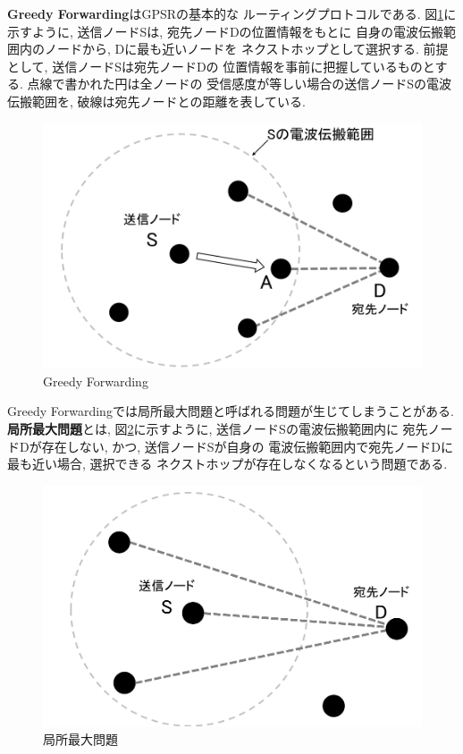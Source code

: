 \indent \textbf{Greedy Forwarding}はGPSRの基本的な
ルーティングプロトコルである. 図\ref{fig:greedy}に示すように, 
送信ノードSは, 宛先ノードDの位置情報をもとに
自身の電波伝搬範囲内のノードから, Dに最も近いノードを
ネクストホップとして選択する. 前提として, 送信ノードSは宛先ノードDの
位置情報を事前に把握しているものとする. 点線で書かれた円は全ノードの
受信感度が等しい場合の送信ノードSの電波伝搬範囲を, 
破線は宛先ノードとの距離を表している.

\begin{figure}
  \centering
  \includegraphics[scale=0.55]{figures/greedy.png}
  \caption{Greedy Forwarding}
  \label{fig:greedy}
\end{figure}

Greedy Forwardingでは局所最大問題と呼ばれる問題が生じてしまうことがある. 
\textbf{局所最大問題}とは, 図\ref{fig:local}に示すように, 送信ノードSの電波伝搬範囲内に
宛先ノードDが存在しない, かつ, 送信ノードSが自身の
電波伝搬範囲内で宛先ノードDに最も近い場合, 選択できる
ネクストホップが存在しなくなるという問題である.

\begin{figure}
  \centering
  \includegraphics[scale=0.55]{figures/local.png}
  \caption{局所最大問題}
  \label{fig:local}
\end{figure}
